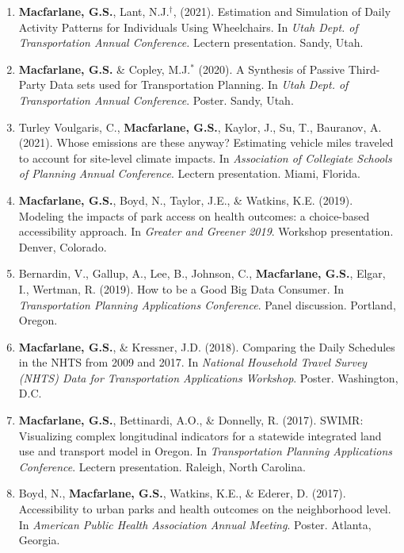 \documentclass[margin,line]{res}
\newcounter{enuminitialize}
\newenvironment{myenum}[1][]
{%
 \setcounter{enuminitialize}{#1}
 \addtocounter{enuminitialize}{2}
 \begin{enumerate}[left= 4pt, itemsep=12pt, start=\value{enuminitialize}, label=\arabic*\addtocounter{enumi}{-2}]
}
{%
 \end{enumerate}
}
\begin{document}
\begin{resume}
\begin{myenum}[17]
\item \textbf{Macfarlane, G.S.}, Lant, N.J.$^\dagger$, (2021). Estimation and Simulation of Daily Activity Patterns for Individuals Using Wheelchairs. In \textit{Utah Dept. of Transportation Annual Conference.} Lectern presentation. Sandy, Utah.

\item \textbf{Macfarlane, G.S.} \& Copley, M.J.$^*$ (2020).  A Synthesis of Passive Third-Party Data sets used for Transportation Planning. In \textit{Utah Dept. of Transportation Annual Conference}. Poster. Sandy, Utah.

\item Turley Voulgaris, C., \textbf{Macfarlane, G.S.}, Kaylor, J., Su, T., Bauranov, A. (2021). Whose emissions are these anyway? Estimating vehicle miles traveled to account for site-level climate impacts. In \textit{Association of Collegiate Schools of Planning Annual Conference}. Lectern presentation. Miami, Florida.

\item \textbf{Macfarlane, G.S.}, Boyd, N., Taylor, J.E., \& Watkins, K.E. (2019). Modeling the impacts of park access on health outcomes: a choice-based accessibility approach. In \textit{ Greater and Greener 2019}. Workshop presentation. Denver, Colorado.

\item Bernardin, V., Gallup, A., Lee, B., Johnson, C., \textbf{Macfarlane, G.S.}, Elgar, I., Wertman, R. (2019). How to be a Good Big Data Consumer. In \textit{ Transportation Planning Applications Conference}. Panel discussion. Portland, Oregon.

\item \textbf{Macfarlane, G.S.}, \& Kressner, J.D. (2018). Comparing the Daily Schedules in the NHTS from 2009 and 2017. In \textit{ National Household Travel Survey (NHTS) Data for Transportation Applications Workshop}. Poster. Washington, D.C.

\item \textbf{Macfarlane, G.S.}, Bettinardi, A.O., \& Donnelly, R. (2017). SWIMR: Visualizing complex longitudinal indicators for a statewide integrated land use and transport model in Oregon. In \textit{Transportation Planning Applications Conference}. Lectern presentation. Raleigh, North Carolina.

\item Boyd, N., \textbf{Macfarlane, G.S.}, Watkins, K.E., \& Ederer, D. (2017). Accessibility to urban parks and health outcomes on the neighborhood level. In \textit{ American Public Health Association Annual Meeting}. Poster. Atlanta, Georgia.


\end{myenum}
\end{resume}
\end{document}
